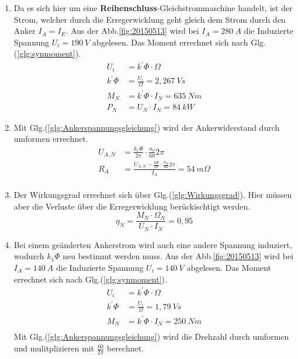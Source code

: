 \begin{solution}
\begin{enumerate}
\item Da es sich hier um eine \textbf{Reihenschluss}-Gleichstrommaschine handelt, ist der Strom, welcher durch die Erregerwicklung geht gleich dem Strom durch den Anker $I_A=I_E$. Aus der Abb.\ref{fig:20150513} wird bei $I_A= 280~A$ die Induzierte Spannung $U_i= 190~V$ abgelesen. Das Moment errechnet sich nach Glg.(\ref{glg:synmoment}).
\begin{align}
U_i &= k^{'} \Phi \cdot \Omega\\
k^{'} \Phi &= \frac{U_i}{\Omega} = 2,267~Vs\\
M_N &= k^{'} \Phi \cdot I_N = 635~Nm\\
P_N &= U_N \cdot I_N =  84~kW
\end{align}
\item Mit Glg.(\ref{glg:Ankerspannungsgleichung}) wird der Ankerwiderstand durch umformen errechnet.\\
\begin{align}
U_{A,N} &= \frac{k_1 \Phi}{2 \pi} \cdot \frac{n_0}{60} 2 \pi\\
R_A &= \frac{U_{A,N} - \frac{k \Phi}{2 \pi} \cdot \frac{n_N}{60} 2 \pi}{I_A}=54~m \Omega\\
\end{align}
\item Der Wirkungsgrad errechnet sich über Glg.(\ref{glg:Wirkungsgrad}). Hier müssen aber die Verluste über die Erregerwicklung berückischtigt werden.
\begin{equation}
\eta_N = \frac{M_N \cdot \Omega_N}{U_N \cdot I_N} =0,95
\end{equation}
\item Bei einem geänderten Ankerstrom wird auch eine andere Spannung induziert, wodurch $k_1 \Phi$ neu bestimmt werden muss. Aus der Abb.\ref{fig:20150513} wird bei $I_A= 140~A$ die Induzierte Spannung $U_i= 140~V$ abgelesen. Das Moment errechnet sich nach Glg.(\ref{glg:synmoment}).
\begin{align}
U_i &= k^{'} \Phi \cdot \Omega\\
k^{'} \Phi &= \frac{U_i}{\Omega} = 1,79~Vs\\
M_N &= k^{'} \Phi \cdot I_N = 250~Nm\\
\end{align}
Mit Glg.(\ref{glg:Ankerspannungsgleichung}) wird die Drehzahl durch umformen und mulitplizieren mit $\frac{60}{2 \pi}$ berechnet.
\begin{align}

\end{align}
\end{enumerate}
\end{solution}
